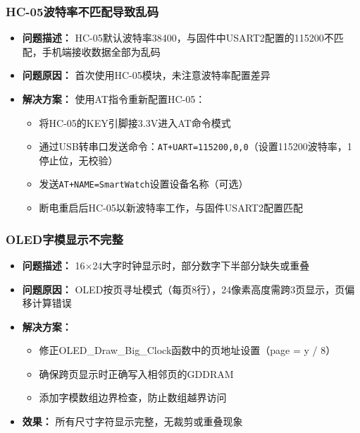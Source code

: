 \subsubsection{HC-05波特率不匹配导致乱码}
\begin{itemize}
    \item \textbf{问题描述：} HC-05默认波特率38400，与固件中USART2配置的115200不匹配，手机端接收数据全部为乱码
    \item \textbf{问题原因：} 首次使用HC-05模块，未注意波特率配置差异
    \item \textbf{解决方案：} 使用AT指令重新配置HC-05：
    \begin{itemize}
        \item 将HC-05的KEY引脚接3.3V进入AT命令模式
        \item 通过USB转串口发送命令：\verb|AT+UART=115200,0,0|（设置115200波特率，1停止位，无校验）
        \item 发送\verb|AT+NAME=SmartWatch|设置设备名称（可选）
        \item 断电重启后HC-05以新波特率工作，与固件USART2配置匹配
    \end{itemize}
\end{itemize}

\subsubsection{OLED字模显示不完整}
\begin{itemize}
    \item \textbf{问题描述：} 16$\times$24大字时钟显示时，部分数字下半部分缺失或重叠
    \item \textbf{问题原因：} OLED按页寻址模式（每页8行），24像素高度需跨3页显示，页偏移计算错误
    \item \textbf{解决方案：}
    \begin{itemize}
        \item 修正OLED\_Draw\_Big\_Clock函数中的页地址设置（page = y / 8）
        \item 确保跨页显示时正确写入相邻页的GDDRAM
        \item 添加字模数组边界检查，防止数组越界访问
    \end{itemize}
    \item \textbf{效果：} 所有尺寸字符显示完整，无裁剪或重叠现象
\end{itemize}

